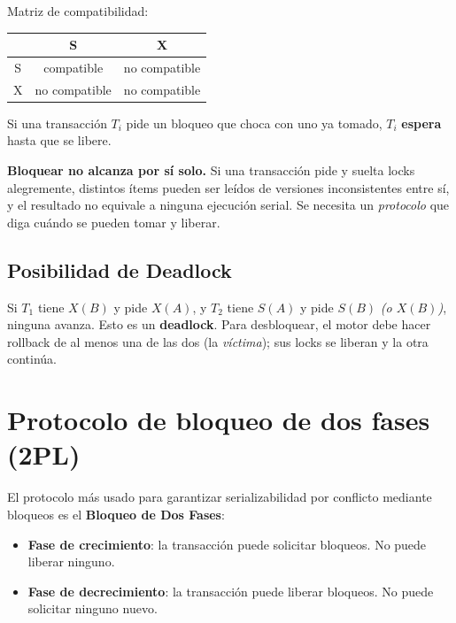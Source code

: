 \documentclass[11pt,a4paper]{article}
\begin{document}
Matriz de compatibilidad:

\begin{center}
\begin{tabular}{c|cc}
\toprule
       & S         & X         \\
\midrule
S      & compatible & no compatible \\
X      & no compatible & no compatible \\
\bottomrule
\end{tabular}
\end{center}

Si una transacción $T_i$ pide un bloqueo que choca con uno ya tomado,
$T_i$ \textbf{espera} hasta que se libere.

\begin{nota}
\textbf{Bloquear no alcanza por sí solo.} Si una transacción pide y
suelta locks alegremente, distintos ítems pueden ser leídos de versiones
inconsistentes entre sí, y el resultado no equivale a ninguna ejecución
serial. Se necesita un \emph{protocolo} que diga cuándo se pueden tomar
y liberar.
\end{nota}

\subsection{Posibilidad de Deadlock}

Si $T_1$ tiene $X(B)$ y pide $X(A)$, y $T_2$ tiene $S(A)$ y pide $S(B)$
\emph{(o $X(B)$)}, ninguna avanza. Esto es un \textbf{deadlock}. Para
desbloquear, el motor debe hacer rollback de al menos una de las dos
(la \emph{víctima}); sus locks se liberan y la otra continúa.

\section{Protocolo de bloqueo de dos fases (2PL)}

El protocolo más usado para garantizar serializabilidad por conflicto
mediante bloqueos es el \textbf{Bloqueo de Dos Fases}:

\begin{itemize}
    \item \textbf{Fase de crecimiento}: la transacción puede solicitar
    bloqueos. No puede liberar ninguno.
    \item \textbf{Fase de decrecimiento}: la transacción puede liberar
    bloqueos. No puede solicitar ninguno nuevo.
\end{itemize}
\end{document}
